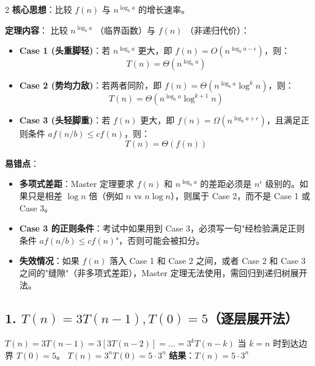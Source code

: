\documentclass[10pt, a4paper]{article}
\begin{document}
\begin{multicols*}{2}
\textbf{核心思想}：比较 $f(n)$ 与 $n^{\log_b a}$ 的增长速率。

\textbf{定理内容}：
比较 $n^{\log_b a}$ （临界函数）与 $f(n)$ （非递归代价）：

\begin{itemize}
    \item \textbf{Case 1 (头重脚轻)}：若 $n^{\log_b a}$ 更大，即 $f(n) = O(n^{\log_b a - \epsilon})$，则：
    $$T(n) = \Theta(n^{\log_b a})$$
    
    \item \textbf{Case 2 (势均力敌)}：若两者同阶，即 $f(n) = \Theta(n^{\log_b a} \log^k n)$，则：
    $$T(n) = \Theta(n^{\log_b a} \log^{k+1} n)$$
    
    \item \textbf{Case 3 (头轻脚重)}：若 $f(n)$ 更大，即 $f(n) = \Omega(n^{\log_b a + \epsilon})$，且满足正则条件 $af(n/b) \le cf(n)$，则：
    $$T(n) = \Theta(f(n))$$
\end{itemize}

\textbf{易错点}：
\begin{itemize}
    \item \textbf{多项式差距}：Master 定理要求 $f(n)$ 和 $n^{\log_b a}$ 的差距必须是 $n^\epsilon$ 级别的。如果只是相差 $\log n$ 倍（例如 $n$ vs $n \log n$），则属于 Case 2，而不是 Case 1 或 Case 3。

    \item \textbf{Case 3 的正则条件}：考试中如果用到 Case 3，必须写一句"经检验满足正则条件 $a f(n/b) \le c f(n)$"，否则可能会被扣分。

    \item \textbf{失效情况}：如果 $f(n)$ 落入 Case 1 和 Case 2 之间，或者 Case 2 和 Case 3 之间的"缝隙"（非多项式差距），Master 定理无法使用，需回归到递归树展开法。
\end{itemize}

\vfill\null
\columnbreak

\subsection{1. $T(n)=3T(n-1), T(0)=5$（逐层展开法）}
$T(n) = 3T(n-1) = 3[3T(n-2)] = \dots = 3^k T(n-k)$\newline
当 $k=n$ 时到达边界 $T(0)=5$。
$T(n) = 3^n T(0) = 5 \cdot 3^n$\newline
\textbf{结果}：$T(n) = 5 \cdot 3^n$

\vspace{12pt}

\end{multicols*}
\end{document}
